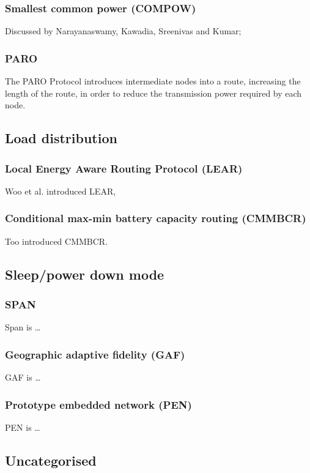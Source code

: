 \documentclass[conference]{IEEEtran}
\begin{document}
\subsubsection{Smallest common power (COMPOW)}
Discussed by Narayanaswamy, Kawadia, Sreenivas and Kumar\cite{narayanaswamy2002power};

\subsubsection{PARO}
The PARO Protocol\cite{gomez2003paro} introduces intermediate nodes into a
route, increasing the length of the route, in order to reduce the transmission
power required by each node.

\subsection{Load distribution}
\subsubsection{Local Energy Aware Routing Protocol (LEAR)}
Woo et al. introduced LEAR\cite{woo2001non},

\subsubsection{Conditional max-min battery capacity routing (CMMBCR)}
Too introduced CMMBCR\cite{toh2001maximum}.

\subsection{Sleep/power­ down mode}
\subsubsection{SPAN}
Span\cite{chen2002span} is \ldots

\subsubsection{Geographic adaptive fidelity (GAF)}
GAF\cite{xu2001geography} is \ldots{}

\subsubsection{Prototype embedded network (PEN)}
PEN\cite{girling2000design} is \ldots

\subsection{Uncategorised}
\end{document}
